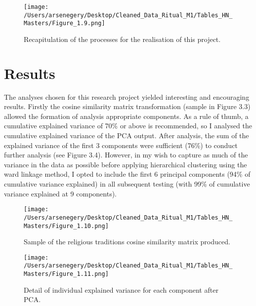 \documentclass[12pt]{report}
\begin{document}
\begin{figure}[htbp]
	\centering
	\texttt{[image: /Users/arsenegery/Desktop/Cleaned\_Data\_Ritual\_M1/Tables\_HN\_Masters/Figure\_1.9.png]} %
	\caption{Recapitulation of the processes for the realisation of this project.} 
	\label{fig:table9}
\end{figure}

	\section{Results}
	
	The analyses chosen for this research project yielded interesting and encouraging results. Firstly the cosine similarity matrix transformation (sample in Figure 3.3) allowed the formation of analysis appropriate components.  As a rule of thumb, a cumulative explained variance of 70\% or above is recommended, so I analysed the cumulative explained variance of the PCA output. After analysis, the sum of the explained variance of the first 3 components were sufficient (76\%) to conduct further analysis (see Figure 3.4). However, in my wish to capture as much of the variance in the data as possible before applying hierarchical clustering using the ward linkage method, I opted to include the first 6 principal components (94\% of cumulative variance explained) in all subsequent testing (with 99\% of cumulative variance explained at 9 components).
	
	\begin{figure}[htbp]
		\centering
		\texttt{[image: /Users/arsenegery/Desktop/Cleaned\_Data\_Ritual\_M1/Tables\_HN\_Masters/Figure\_1.10.png]} %
		\caption{Sample of the religious traditions cosine similarity matrix produced.} 
		\label{fig:table10}
	\end{figure}
	
	\begin{figure}[htbp]
		\centering
		\texttt{[image: /Users/arsenegery/Desktop/Cleaned\_Data\_Ritual\_M1/Tables\_HN\_Masters/Figure\_1.11.png]} %
		\caption{Detail of individual explained variance for each component after PCA.} 
		\label{fig:table11}
	\end{figure}
	
\end{document}
